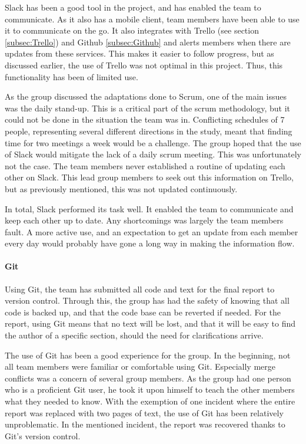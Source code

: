 \documentclass[11pt,a4paper,titlepage,oneside]{report}
\begin{document}
Slack has been a good tool in the project, and has enabled the team to communicate. As it also has a mobile client, team members have been able to use it to communicate on the go. It also integrates with Trello (see section \ref{subsec:Trello}) and Github \ref{subsec:Github} and alerts members when there are updates from these services. This makes it easier to follow progress, but as discussed earlier, the use of Trello was not optimal in this project. Thus, this functionality has been of limited use. 

As the group discussed the adaptations done to Scrum, one of the main issues was the daily stand-up. This is a critical part of the scrum methodology, but it could not be done in the situation the team was in. Conflicting schedules of 7 people, representing several different directions in the study, meant that finding time for two meetings a week would be a challenge. The group hoped that the use of Slack would mitigate the lack of a daily scrum meeting. This was unfortunately not the case. The team members never established a routine of updating each other on Slack. This lead group members to seek out this information on Trello, but as previously mentioned, this was not updated continuously. 

In total, Slack performed its task well. It enabled the team to communicate and keep each other up to date. Any shortcomings was largely the team members fault. A more active use, and an expectation to get an update from each member every day would probably have gone a long way in making the information flow.

\paragraph{Git}
Using Git, the team has submitted all code and text for the final report to version control. Through this, the group has had the safety of knowing that all code is backed up, and that the code base can be reverted if needed. For the report, using Git means that no text will be lost, and that it will be easy to find the author of a specific section, should the need for clarifications arrive. 

The use of Git has been a good experience for the group. In the beginning, not all team members were familiar or comfortable using Git. Especially merge conflicts was a concern of several group members. As the group had one person who is a proficient Git user, he took it upon himself to teach the other members what they needed to know. With the exemption of one incident where the entire report was replaced with two pages of text, the use of Git has been relatively unproblematic. In the mentioned incident, the report was recovered thanks to Git's version control. 
\end{document}
